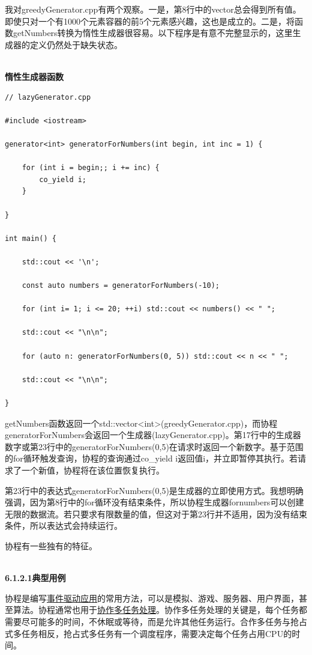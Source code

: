 我对greedyGenerator.cpp有两个观察。一是，第8行中的vector总会得到所有值。即使只对一个有1000个元素容器的前5个元素感兴趣，这也是成立的。二是，将函数getNumbers转换为惰性生成器很容易。以下程序是有意不完整显示的，这里生成器的定义仍然处于缺失状态。

\hspace*{\fill} \\ %
\noindent
\textbf{惰性生成器函数}
\begin{lstlisting}[style=styleCXX]
// lazyGenerator.cpp

#include <iostream>

generator<int> generatorForNumbers(int begin, int inc = 1) {

	for (int i = begin;; i += inc) {
		co_yield i;
	}

}

int main() {

	std::cout << '\n';
	
	const auto numbers = generatorForNumbers(-10);
	
	for (int i= 1; i <= 20; ++i) std::cout << numbers() << " ";
	
	std::cout << "\n\n";
	
	for (auto n: generatorForNumbers(0, 5)) std::cout << n << " ";
	
	std::cout << "\n\n";

}
\end{lstlisting}

getNumbers函数返回一个std::vector<int>(greedyGenerator.cpp)，而协程generatorForNumbers会返回一个生成器(lazyGenerator.cpp)。第17行中的生成器数字或第23行中的generatorForNumbers(0,5)在请求时返回一个新数字。基于范围的for循环触发查询，协程的查询通过co\_yield i返回值i，并立即暂停其执行。若请求了一个新值，协程将在该位置恢复执行。

第23行中的表达式generatorForNumbers(0,5)是生成器的立即使用方式。我想明确强调，因为第8行中的for循环没有结束条件，所以协程生成器fornumbers可以创建无限的数据流。若只要求有限数量的值，但这对于第23行并不适用，因为没有结束条件，所以表达式会持续运行。


协程有一些独有的特征。

\hspace*{\fill} \\ %
\noindent
\textbf{6.1.2.1\hspace{0.2cm}典型用例}

协程是编写\href{https://en.wikipedia.org/wiki/Event-driven_programming}{事件驱动应用}的常用方法，可以是模拟、游戏、服务器、用户界面，甚至算法。协程通常也用于\href{https://en.wikipedia.org/wiki/Computer_multitasking}{协作多任务处理}。协作多任务处理的关键是，每个任务都需要尽可能多的时间，不休眠或等待，而是允许其他任务运行。合作多任务与抢占式多任务相反，抢占式多任务有一个调度程序，需要决定每个任务占用CPU的时间。

